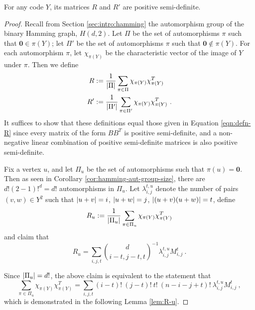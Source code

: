 \documentclass{report}
\newcommand{\wt}[1]{\abs{ #1 }}
\newcommand{\vzero}{\mathbf{0}}
\newcommand{\lijtu}{\lambda_{i, j}^{t, u}}
\newcommand{\Mijt}{M_{i, j}^t}
\newcommand{\chipiY}{\chi_{\pi(Y)}}
\begin{document}
    \begin{thm}\label{thm:R-psd}
      For any code $Y$, its matrices $R$ and $R'$ are positive semi-definite.
    \end{thm}

    \begin{proof}

      Recall from Section \ref{sec:intro:hamming} the automorphism group of
      the binary Hamming graph, $H(d, 2)$.  Let $\Pi$ be the set of
      automorphisms $\pi$ such that $\vzero \in \pi(Y)$; let $\Pi'$ be the set of
      automorphisms $\pi$ such that $\vzero \not\in \pi(Y)$.  For each
      automorphism $\pi$, let $\chipiY$ be the characteristic vector of the
      image of $Y$ under $\pi$.  Then we define
      \begin{equation}\label{eqn:alt-defn-R} \begin{aligned}
        R  &:= \frac{1}{\abs{\Pi}} \sum_{\pi \in \Pi} \chipiY \chipiY^T \\
        R' &:= \frac{1}{\abs{\Pi'}} \sum_{\pi \in \Pi'} \chipiY \chipiY^T \ .
      \end{aligned} \end{equation}
      It suffices to show that these definitions equal those given in Equation
      \ref{eqn:defn-R} since every matrix of the form $BB^T$ is positive
      semi-definite, and a non-negative linear combination of positive
      semi-definite matrices is also positive semi-definite.

      Fix a vertex $u$, and let $\Pi_u$ be the set of automorphisms such that
      $\pi(u) = \vzero$.  Then as seen in Corollary
      \ref{cor:hamming-aut-group-size}, there are $d! (2-1)!^d = d!$
      automorphisms in $\Pi_u$.  Let $\lijtu$ denote the number of pairs $(v, w)
      \in Y^2$ such that $\wt{u + v} = i$, $\wt{u + w} = j$, $\wt{(u+v)(u+w)} =
      t$, define
      $$
        R_u := \frac{1}{\abs{\Pi_u}} \sum_{\pi \in \Pi_u} \chipiY \chipiY^T
      $$
      and claim that
      \begin{equation}\label{eqn:R-u}
        R_u = \sum_{i, j, t} \binom{d}{i-t, j-t, t}^{-1} \lijtu \Mijt \ .
      \end{equation}

      Since $\left\lvert \Pi_u \right\rvert = d!$, the above claim is equivalent to the statement
      that
      $$
        \sum_{\pi \in \Pi_u} \chipiY \chipiY^T =
        \sum_{i, j, t} (i-t)!\ (j-t)!\ t!\ (n-i-j+t)!\ \lijtu \Mijt \ ,
      $$
      which is demonstrated in the following Lemma \ref{lem:R-u}.


\end{proof}
\end{document}
